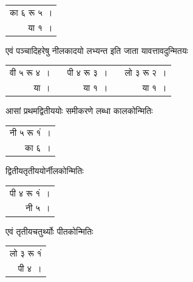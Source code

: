 \documentclass[11pt, openany]{book}
\begin{document}
\begin{table}[h!]
    \centering\s
    \begin{tabular}{r}
         का ६ रू ५~। \\
        या १~। 
    \end{tabular}
\end{table}
\vspace{-2mm}

एवं पञ्चादिहरेषु नीलकादयो लभ्यन्त इति जाता यावत्तावदुन्मितयः 
\vspace{-2mm}

\begin{table}[h!]
    \centering\s
    \begin{tabular}{rp{5mm}rp{5mm}r}
     वी ५ रू ४~।&& पी ४ रू ३~।&& लो ३ रू २~। \\
 या~। &&या १~।&& या १~। 
    \end{tabular}
\end{table}
\vspace{-2mm}

आसां प्रथमद्वितीययोः समीकरणे लब्धा कालकोन्मितिः 
\vspace{-2mm}

\begin{table}[h!]
    \centering\s
    \begin{tabular}{r}
 नी ५ रू १ं~। \\
 का ६~। 
    \end{tabular}
\end{table}
\vspace{-2mm}

द्वितीयतृतीययोर्नीलकोन्मितिः 
\vspace{-2mm}

\begin{table}[h!]
    \centering\s
    \begin{tabular}{r}
 पी ४ रू १ं~। \\
 नी ५~।
    \end{tabular}
\end{table}
\newpage
एवं तृतीयचतुर्थ्योः पीतकोन्मितिः 
\vspace{-2mm}

\begin{table}[h!]
    \centering\s
    \begin{tabular}{r}
        लो ३ रू १ं \\
 पी ४~। 
    \end{tabular}
\end{table}
\vspace{-2mm}
\end{document}
